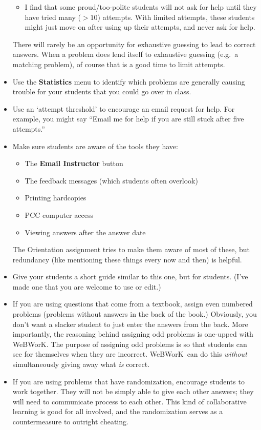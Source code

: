\documentclass[12pt]{article}
\newcommand{\menu}[1]{\textbf{#1}}
\newcommand{\WW}{WeBWorK}
\begin{document}
\begin{itemize}
\begin{itemize}
\item I find that some proud/too-polite students will not ask for help until they have tried many ($>\!\!10$) attempts.   With limited attempts, these students might just move on after using up their attempts, and never ask for help.

\end{itemize}

There will rarely be an opportunity for exhaustive guessing to lead to correct answers.  When a problem does lend itself to exhaustive guessing (e.g.\ a matching problem), of course that is a good time to limit attempts.

\item Use the \menu{Statistics} menu to identify which problems are generally causing trouble for your students that you could go over in class.

\item Use an `attempt threshold' to encourage an email request for help.  For example, you might say ``Email me for help if you are still stuck after five attempts.''

\item Make sure students are aware of the tools they have:
\begin{itemize}
\item The \menu{Email Instructor} button
\item The feedback messages (which students often overlook)
\item Printing hardcopies
\item PCC computer access
\item Viewing answers after the answer date
\end{itemize}
The Orientation assignment tries to make them aware of most of these, but redundancy (like mentioning these things every now and then) is helpful.

\item Give your students a short guide similar to this one, but for students.  (I've made one that you are welcome to use or edit.)  

\item If you are using questions that come from a textbook, assign even numbered problems (problems without answers in the back of the book.)  Obviously, you don't want a slacker student to just enter the answers from the back.  More importantly, the reasoning behind assigning odd problems is one-upped with \WW.  The purpose of assigning odd problems is so that students can see for themselves when they are incorrect.  \WW\ can do this \emph{without} simultaneously giving away what \emph{is} correct.

\item If you are using problems that have randomization, encourage students to work together. They will not be simply able to give each other answers; they will need to communicate process to each other. This kind of collaborative learning is good for all involved, and the randomization serves as a countermeasure to outright cheating.




\end{itemize}
\end{document}
